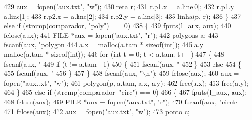 \begin{DoxyCode}
{{429                 aux = fopen(\textcolor{stringliteral}{"aux.txt"}, \textcolor{stringliteral}{"w"});
430                 reta r;
431                 r.p1.x = a.line[0];
432                 r.p1.y = a.line[1];
433                 r.p2.x = a.line[2];
434                 r.p2.y = a.line[3];
435                 linha(p, r);
436             \}
437             \textcolor{keywordflow}{else} \textcolor{keywordflow}{if} (strcmp(comparador, \textcolor{stringliteral}{"poly"}) == 0)
438             \{
439                 fputs(l\_aux, aux);
440                 fclose(aux);
441                 FILE *aux = fopen(\textcolor{stringliteral}{"aux.txt"}, \textcolor{stringliteral}{"r"});
442                 polygons a;
443                 fscanf(aux, \textcolor{stringliteral}{"polygon %
444                 a.x = malloc(a.tam * \textcolor{keyword}{sizeof}(\textcolor{keywordtype}{int}));
445                 a.y = malloc(a.tam * \textcolor{keyword}{sizeof}(\textcolor{keywordtype}{int}));
446                 \textcolor{keywordflow}{for} (\textcolor{keywordtype}{int} t = 0; t < a.tam; t++)
447                 \{
448                     fscanf(aux, \textcolor{stringliteral}{"%
449                     \textcolor{keywordflow}{if} (t != a.tam - 1)
450                     \{
451                         fscanf(aux, \textcolor{stringliteral}{"%
452                     \}
453                     \textcolor{keywordflow}{else}
454                     \{
455                         fscanf(aux, \textcolor{stringliteral}{"%
456                     \}
457                 \}
458                 fscanf(aux, \textcolor{stringliteral}{"\(\backslash\)n"});
459                 fclose(aux);
460                 aux = fopen(\textcolor{stringliteral}{"aux.txt"}, \textcolor{stringliteral}{"w"});
461                 polygon(p, a.tam, a.x, a.y);
462                 free(a.x);
463                 free(a.y);
464             \}
465             \textcolor{keywordflow}{else} \textcolor{keywordflow}{if} (strcmp(comparador, \textcolor{stringliteral}{"circ"}) == 0)
466             \{
467                 fputs(l\_aux, aux);
468                 fclose(aux);
469                 FILE *aux = fopen(\textcolor{stringliteral}{"aux.txt"}, \textcolor{stringliteral}{"r"});
470                 fscanf(aux, \textcolor{stringliteral}{"circle %
471                 fclose(aux);
472                 aux = fopen(\textcolor{stringliteral}{"aux.txt"}, \textcolor{stringliteral}{"w"});
473                 ponto c;
}}}}}}}
\end{DoxyCode}
